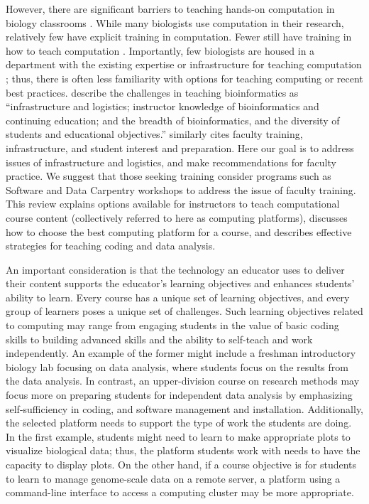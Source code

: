 However, there are significant barriers to teaching hands-on computation in biology classrooms \citep{Williams17}.
While many biologists use computation in their research, relatively few have explicit training in computation. 
Fewer still have training in how to teach computation \citep{Williams17}.
Importantly, few biologists are housed in a department with the existing expertise or infrastructure for teaching computation \citep{Williams17};
thus, there is often less familiarity with options for teaching computing or recent best practices. 
\citet{Cummings10} describe the challenges in teaching bioinformatics as 
``infrastructure and logistics; instructor knowledge of bioinformatics and continuing education; and the breadth of bioinformatics, and the diversity of students and educational objectives.''
\citet{Williams17} similarly cites faculty training, infrastructure, and student interest and preparation.
Here our goal is to address issues of infrastructure and logistics,
and make recommendations for faculty practice.
We suggest that those seeking training consider programs such as Software and Data Carpentry workshops
to address the issue of faculty training.
This review explains options available for instructors to teach computational course content
(collectively referred to here as computing platforms),
discusses how to choose the best computing platform for a course, 
and describes effective strategies for teaching coding and data analysis.


An important consideration is that the technology an educator uses to deliver their content supports the educator's learning objectives and enhances students' ability to learn. 
Every course has a unique set of learning objectives, and
every group of learners poses a unique set of challenges. 
Such learning objectives related to computing may range from engaging students in the value of basic coding skills to building advanced skills and the ability to self-teach and work independently.
An example of the former might include a freshman introductory biology lab focusing on data analysis, where students focus on the results from the data analysis. 
In contrast, an upper-division course on research methods may focus more on preparing students for independent data analysis by emphasizing self-sufficiency in coding, and software management and installation.
Additionally, the selected platform needs to support the type of work the students are doing.
In the first example, students might need to learn to make appropriate plots to visualize biological data; thus, the platform students work with needs to have the capacity to display plots.
On the other hand, if a course objective is for students to learn to manage genome-scale data on a remote server, a platform using a command-line interface to access a computing cluster may be more appropriate.

